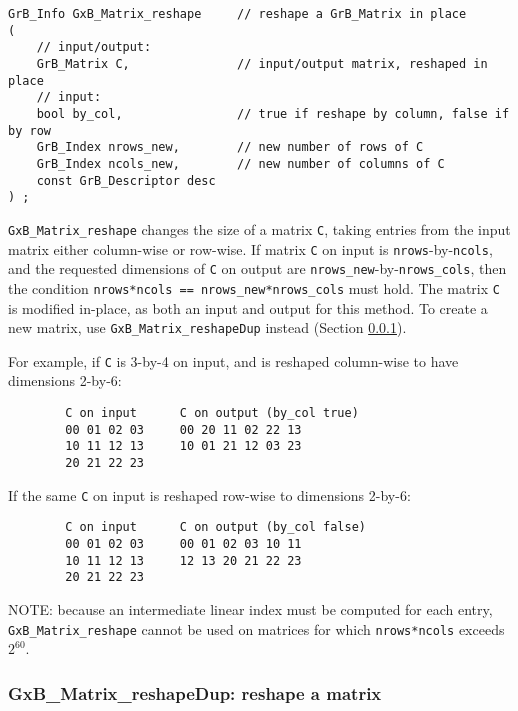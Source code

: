 \documentclass[12pt]{article}
\begin{document}
\begin{mdframed}[userdefinedwidth=6in]
{\footnotesize
\begin{verbatim}
GrB_Info GxB_Matrix_reshape     // reshape a GrB_Matrix in place
(
    // input/output:
    GrB_Matrix C,               // input/output matrix, reshaped in place
    // input:
    bool by_col,                // true if reshape by column, false if by row
    GrB_Index nrows_new,        // new number of rows of C
    GrB_Index ncols_new,        // new number of columns of C
    const GrB_Descriptor desc
) ;
\end{verbatim} } \end{mdframed}

\verb'GxB_Matrix_reshape' changes the size of a matrix \verb'C', taking entries
from the input matrix either column-wise or row-wise.  If matrix \verb'C' on
input is \verb'nrows'-by-\verb'ncols', and the requested dimensions of
\verb'C' on output are \verb'nrows_new'-by-\verb'nrows_cols', then
the condition \verb'nrows*ncols == nrows_new*nrows_cols' must hold.
The matrix \verb'C' is modified in-place, as both an input and output for
this method.  To create a new matrix, use \verb'GxB_Matrix_reshapeDup'
instead (Section \ref{matrix_reshapedup}).

For example, if \verb'C' is 3-by-4 on input, and is reshaped column-wise to
have dimensions 2-by-6:

\begin{verbatim}
        C on input      C on output (by_col true)
        00 01 02 03     00 20 11 02 22 13
        10 11 12 13     10 01 21 12 03 23
        20 21 22 23
\end{verbatim}

If the same \verb'C' on input is reshaped row-wise to dimensions 2-by-6:

\begin{verbatim}
        C on input      C on output (by_col false)
        00 01 02 03     00 01 02 03 10 11
        10 11 12 13     12 13 20 21 22 23
        20 21 22 23
\end{verbatim}

NOTE: because an intermediate linear index must be computed for each entry,
\verb'GxB_Matrix_reshape' cannot be used on matrices for which
\verb'nrows*ncols' exceeds $2^{60}$.

\newpage
\subsubsection{{\sf GxB\_Matrix\_reshapeDup:} reshape a matrix}
\label{matrix_reshapedup}
\end{document}
